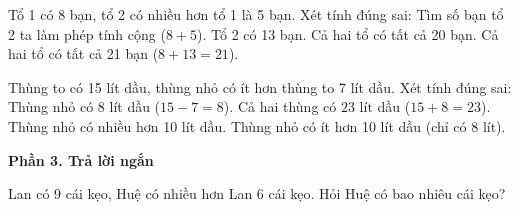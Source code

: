 \begin{ex} %
Tổ 1 có 8 bạn, tổ 2 có nhiều hơn tổ 1 là 5 bạn. Xét tính đúng sai:
\choiceTF
{\True Tìm số bạn tổ 2 ta làm phép tính cộng ($8 + 5$).}
{\True Tổ 2 có 13 bạn.}
{Cả hai tổ có tất cả 20 bạn.}
{\True Cả hai tổ có tất cả 21 bạn ($8 + 13 = 21$).}
\end{ex}

\begin{ex} %
Thùng to có 15 lít dầu, thùng nhỏ có ít hơn thùng to 7 lít dầu. Xét tính đúng sai:
\choiceTF
{\True Thùng nhỏ có 8 lít dầu ($15 - 7 = 8$).}
{\True Cả hai thùng có $23\text{ lít}$ dầu ($15 + 8 = 23$).}
{Thùng nhỏ có nhiều hơn 10 lít dầu.}
{\True Thùng nhỏ có ít hơn 10 lít dầu (chỉ có $8\text{ lít}$).}
\end{ex}

\textbf{Phần 3. Trả lời ngắn}

\begin{ex} %
Lan có 9 cái kẹo, Huệ có nhiều hơn Lan 6 cái kẹo. Hỏi Huệ có bao nhiêu cái kẹo?
\end{ex}

